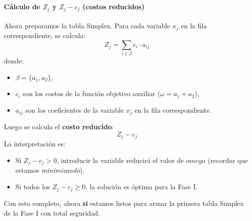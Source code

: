 \paragraph{Cálculo de \(Z_j\) y \(Z_{j}-c_j\) (costos reducidos)}

Ahora preparamos la tabla Simplex. Para cada variable \(x_j\) en la fila correspondiente, se calcula:
\[
  Z_j = \sum_{i \in \beta} c_i \cdot a_{ij}
\]
donde:
\begin{itemize}
  \item \(\beta=\{a_1, a_2\}\),
  \item \(c_i\) son los costos de la función objetivo auxiliar (\(\omega = a_1 + a_2\)),
  \item \(a_{ij}\) son los coeficientes de la variable \(x_j\) en la fila correspondiente.
\end{itemize}
Luego se calcula el \textbf{costo reducido}:
\[
  Z_j - c_j
\]
La interpretación es:
\begin{itemize}
  \item Si \(Z_j - c_j > 0\), introducir la variable reducirá el valor de \(omega\) (recordar que estamos \textit{minimizando}).
  \item Si todos los \(Z_j - c_j \geq 0\), la solución es óptima para la Fase I.
\end{itemize}
Con esto completo, ahora \textbf{si} estamos listos para armar la primera tabla Simplex de la Fase I con total seguridad.








